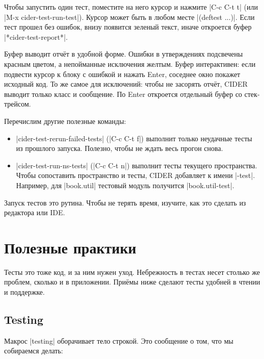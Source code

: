 Чтобы запустить один тест, поместите на него курсор и нажмите \spverb|C-c C-t t|
(или \spverb|M-x cider-test-run-test|). Курсор может быть в любом месте
\spverb|(deftest ...)|. Если тест прошел без ошибок, внизу появится зеленый
текст, иначе откроется буфер \spverb|*cider-test-report*|.

Буфер выводит отч\"{е}т в удобной форме. Ошибки в утверждениях подсвечены красным
цветом, а непойманные исключения желтым. Буфер интерактивен: если подвести
курсор к блоку с ошибкой и нажать Enter, соседнее окно покажет исходный код. То
же самое для исключений: чтобы не засорять отч\"{е}т, CIDER выводит только класс и
сообщение. По Enter откроется отдельный буфер со стек-трейсом.

Перечислим другие полезные команды:

\begin{itemize}

\item
  \spverb|cider-test-rerun-failed-tests| (\spverb|C-c C-t f|) выполнит только
  неудачные тесты из прошлого запуска. Полезно, чтобы не ждать весь прогон
  снова.

\item
  \spverb|cider-test-run-ns-tests| (\spverb|C-c C-t n|) выполнит тесты текущего
  пространства. Чтобы сопоставить пространство и тесты, CIDER добавляет к имени
  \spverb|-test|. Например, для \spverb|book.util| тестовый модуль получится
  \spverb|book.util-test|.

\end{itemize}

Запуск тестов это рутина. Чтобы не терять время, изучите, как это сделать из
редактора или IDE.

\section{Полезные практики}

Тесты это тоже код, и за ним нужен уход. Небрежность в тестах несет столько же
проблем, сколько и в приложении. При\"{е}мы ниже сделают тесты удобней в чтении и
поддержке.

\subsection{Testing}


Макрос \spverb|testing| оборачивает тело строкой. Это сообщение о том, что мы
собираемся делать:

